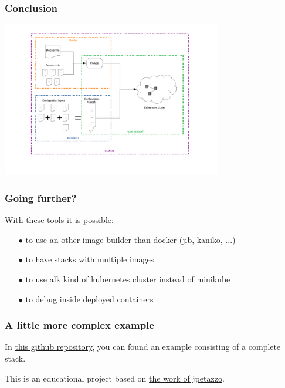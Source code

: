 \section*{}

	\begin{frame}
		\frametitle{Conclusion}
		
		\begin{center}
		\includegraphics[height=6.8cm]{../../../resources/color/skaffoldKustomizeArchitecture.pdf}
		\end{center}
		
	\end{frame}
	
	\begin{frame}
		\frametitle{Going further?}
		
		With these tools it is possible:
		\begin{itemize}
			\item[$\bullet$] to use an other image builder than docker (jib, kaniko, ...)
			\item[$\bullet$] to have stacks with multiple images
			\item[$\bullet$] to use alk kind of kubernetes cluster instead of minikube
			\item[$\bullet$] to debug inside deployed containers
		\end{itemize}
	\end{frame}
	
	\begin{frame}
		\frametitle{A little more complex example}
		
		In \href{https://github.com/Tinkou/kubercoins}{this github repository}, you can found an example consisting of a complete stack.
		
		\bigskip
		
		This is an educational project based on \href{https://github.com/jpetazzo/dockercoins}{the work of jpetazzo}.

	\end{frame}
	
